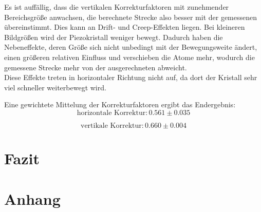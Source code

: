 \documentclass[12pt,a4paper]{article}
\begin{document}
Es ist auffällig, dass die vertikalen Korrekturfaktoren mit zunehmender Bereichsgröße anwachsen, die berechnete Strecke also besser mit der gemessenen übereinstimmt. Dies kann an Drift- und Creep-Effekten liegen. Bei kleineren Bildgrößen wird der Piezokristall weniger bewegt. Dadurch haben die Nebeneffekte, deren Größe sich nicht unbedingt mit der Bewegungsweite ändert, einen größeren relativen Einfluss und verschieben die Atome mehr, wodurch die gemessene Strecke mehr von der ausgerechneten abweicht.\\
Diese Effekte treten in horizontaler Richtung nicht auf, da dort der Kristall sehr viel schneller weiterbewegt wird.

Eine gewichtete Mittelung der Korrekturfaktoren ergibt das Endergebnis:
\begin{equation*}
\boxed{\textrm{horizontale Korrektur}: 0.561\pm 0.035}
\end{equation*}

\begin{equation*}
\boxed{\textrm{vertikale Korrektur}: 0.660\pm 0.004}
\end{equation*}

\section{Fazit}

\section{Anhang}
\end{document}
